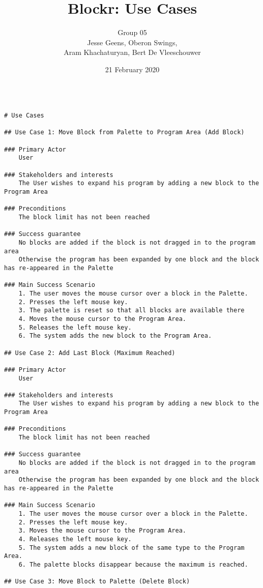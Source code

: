 \documentclass{article}
\title{\vspace{-50pt}Blockr: Use Cases}
\author{Group 05\\ Jesse Geens, Oberon Swings,\\ Aram Khachaturyan, Bert De Vleeschouwer}
\date{21 February 2020}
\begin{document}
\maketitle

\begin{verbatim}

# Use Cases

## Use Case 1: Move Block from Palette to Program Area (Add Block)

### Primary Actor 
    User
    
### Stakeholders and interests
    The User wishes to expand his program by adding a new block to the Program Area
    
### Preconditions
    The block limit has not been reached
    
### Success guarantee
    No blocks are added if the block is not dragged in to the program area 
    Otherwise the program has been expanded by one block and the block has re-appeared in the Palette
    
### Main Success Scenario
    1. The user moves the mouse cursor over a block in the Palette.
    2. Presses the left mouse key.
    3. The palette is reset so that all blocks are available there
    4. Moves the mouse cursor to the Program Area.
    5. Releases the left mouse key.
    6. The system adds the new block to the Program Area.

## Use Case 2: Add Last Block (Maximum Reached)

### Primary Actor 
    User
    
### Stakeholders and interests
    The User wishes to expand his program by adding a new block to the Program Area
    
### Preconditions
    The block limit has not been reached
    
### Success guarantee
    No blocks are added if the block is not dragged in to the program area 
    Otherwise the program has been expanded by one block and the block has re-appeared in the Palette
    
### Main Success Scenario
    1. The user moves the mouse cursor over a block in the Palette.
    2. Presses the left mouse key. 
    3. Moves the mouse cursor to the Program Area. 
    4. Releases the left mouse key.
    5. The system adds a new block of the same type to the Program Area.
    6. The palette blocks disappear because the maximum is reached.
    
## Use Case 3: Move Block to Palette (Delete Block)


\end{verbatim}
\end{document}
